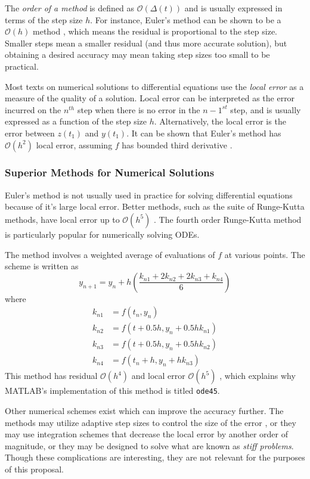 The \textit{order of a method} is defined as $ \mathcal{O}(\Delta (t)) $ and is usually expressed in terms of the step size $ h $.  For instance, Euler's method can be shown to be a $ \mathcal{O}(h) $ method \cite{corless2013graduate}, which means the residual is proportional to the step size.  Smaller steps mean a smaller residual (and thus more accurate solution), but obtaining a desired accuracy may mean taking step sizes too small to be practical.

Most texts on numerical solutions to differential equations use the \textit{local error} as a measure of the quality of a solution.  Local error can be interpreted as the error incurred on the $ n^{th} $ step when there is no error in the $ n-1^{st} $ step, and is usually expressed as a function of the step size $ h $.  Alternatively, the local error is the error between $ z(t_1) $ and $ y(t_1) $. It can be shown that Euler's method has $ \mathcal{O}(h^2) $ local error, assuming $ f $ has bounded third derivative \cite{corless2013graduate}.

\subsubsection{Superior Methods for Numerical Solutions}

Euler's method is not usually used in practice for solving differential equations because of it's large local error.  Better methods, such as the suite of Runge-Kutta methods,  have local error up to  $ \mathcal{O}(h^5) $ \cite{boyce2012differential}.  The fourth order Runge-Kutta method is particularly popular for numerically solving ODEs.

The method involves a weighted average of evaluations of $ f $ at various points.  The scheme is written as 
%
\begin{equation}\label{RK}
	y_{n+1} = y_n + h \left( \dfrac{k_{n1} + 2k_{n2} + 2k_{n3} + k_{n4}}{6}\right)
\end{equation}
%
where
\begin{align*}
	k_{n1} &= f(t_n, y_n) \\
	k_{n2} &= f(t+0.5h, y_n + 0.5hk_{n1}) \\
	k_{n3} &= f(t + 0.5h, y_n + 0.5hk_{n2})\\
	k_{n4} &= f(t_n + h, y_n + hk_{n3})
\end{align*}
%
This method has residual $ \mathcal{O}(h^4) $ and local error $ \mathcal{O}(h^5) $ \cite{boyce2012differential}, which explains why MATLAB's implementation of this method is titled \verb|ode45|. 

Other numerical schemes exist which can improve the accuracy further.  The methods may utilize adaptive step sizes to control the size of the error \cite{corless2013graduate}, or they may use integration schemes that decrease the local error by another order of magnitude, or they may be designed to solve what are known as \textit{stiff problems}.  Though these complications are interesting, they are not relevant for the purposes of this proposal.